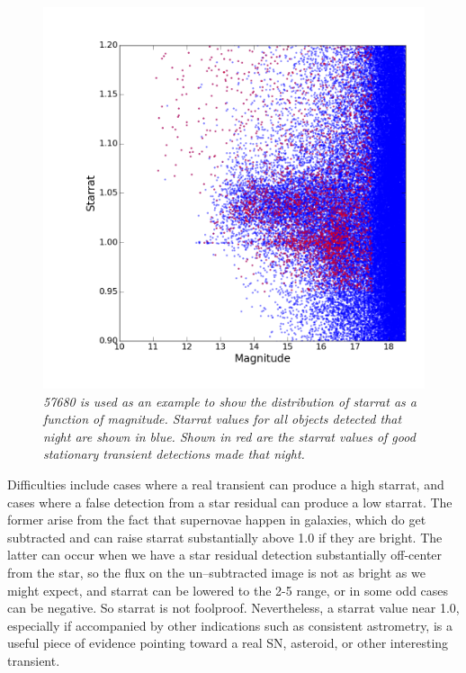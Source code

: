 \documentclass[aps,prb,twocolumn,superscriptaddress]{revtex4-1}
\begin{document}
\begin{figure}[h!]%
\begin{center}
    \includegraphics[width=1\linewidth]{figures/Starrat_mag_low_alpha0tac5_remake.png}%
     \caption{\it \small{57680 is used as an example to show the distribution of starrat as a function of magnitude.  Starrat values for all objects detected that night are shown in blue.  Shown in red are the starrat values of good stationary transient detections made that night.~\label{fig:starrat}}}%
  \end{center}
\end{figure}

Difficulties include cases where a real transient can produce a high 
starrat, and cases where a false detection from a star residual can 
produce a low starrat. The former arise from the fact that supernovae 
happen in galaxies, which do get subtracted and can raise starrat 
substantially above 1.0 if they are bright. The latter can occur when 
we have a star residual detection substantially off-center from the 
star, so the flux on the un--subtracted image is not as bright as we might 
expect, and starrat can be lowered to the 2-5 range, or in some odd 
cases can be negative. So starrat is not foolproof. Nevertheless, a 
starrat value near 1.0, especially if accompanied by other indications 
such as consistent astrometry, is a useful piece of evidence pointing 
toward a real SN, asteroid, or other interesting transient.
\end{document}
